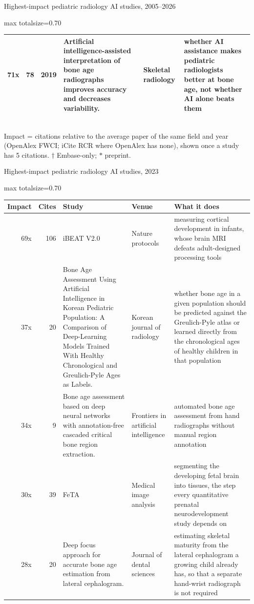 \documentclass[aspectratio=169]{beamer}
\renewcommand{\arraystretch}{1.08}
\begin{document}
\begin{frame}[category=Journals/Preprints]{Highest-impact pediatric radiology AI studies, 2005--2026}
\begin{adjustbox}{max totalsize={\textwidth}{0.70\textheight}}
\begin{tabular}{|r|r|r|>{\raggedright\arraybackslash}p{}|>{\raggedright\arraybackslash}p{}|>{\raggedright\arraybackslash}p{}|}
71x & 78 & 2019 & Artificial intelligence-assisted interpretation of bone age radiographs improves accuracy and decreases variability. & Skeletal radiology & whether AI assistance makes pediatric radiologists better at bone age, not whether AI alone beats them \\ \hline
\end{tabular}
\end{adjustbox}
\\[2pt]
{\tiny Impact = citations relative to the average paper of the same field and year (OpenAlex FWCI; iCite RCR where OpenAlex has none), shown once a study has 5 citations. $\dagger$ Embase-only; $\ast$ preprint.}
\end{frame}

\begin{frame}[category=Journals/Preprints]{Highest-impact pediatric radiology AI studies, 2023}
\tiny
\begin{adjustbox}{max totalsize={\textwidth}{0.70\textheight}}
\renewcommand{\arraystretch}{1.2}
\begin{tabular}{|r|r|>{\raggedright\arraybackslash}p{}|>{\raggedright\arraybackslash}p{}|>{\raggedright\arraybackslash}p{}|}
\hline \textbf{Impact} & \textbf{Cites} & \textbf{Study} & \textbf{Venue} & \textbf{What it does} \\ \hline
69x & 106 & iBEAT V2.0 & Nature protocols & measuring cortical development in infants, whose brain MRI defeats adult-designed processing tools \\ \hline
37x & 20 & Bone Age Assessment Using Artificial Intelligence in Korean Pediatric Population: A Comparison of Deep-Learning Models Trained With Healthy Chronological and Greulich-Pyle Ages as Labels. & Korean journal of radiology & whether bone age in a given population should be predicted against the Greulich-Pyle atlas or learned directly from the chronological ages of healthy children in that population \\ \hline
34x & 9 & Bone age assessment based on deep neural networks with annotation-free cascaded critical bone region extraction. & Frontiers in artificial intelligence & automated bone age assessment from hand radiographs without manual region annotation \\ \hline
30x & 39 & FeTA & Medical image analysis & segmenting the developing fetal brain into tissues, the step every quantitative prenatal neurodevelopment study depends on \\ \hline
28x & 20 & Deep focus approach for accurate bone age estimation from lateral cephalogram. & Journal of dental sciences & estimating skeletal maturity from the lateral cephalogram a growing child already has, so that a separate hand-wrist radiograph is not required \\ \hline

\end{tabular}
\end{adjustbox}
\end{frame}
\end{document}
